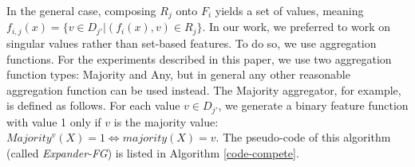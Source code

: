 \documentclass{article}
\theoremstyle{definition}
\begin{document}

In the general case, composing $R_j$ onto $F_i$ yields a set of values, meaning $f_{i,j}(x)=\{v\in D_{j'}|(f_i(x),v)\in R_j\}$. 
In our work, we preferred to work on singular values rather than set-based features. To do so, we use aggregation functions.
For the experiments described in this paper, we use  
two aggregation function types: Majority and Any, but in general any other reasonable aggregation function can be used instead.
The Majority aggregator, for example, is defined as follows.  For each value $v\in D_{j'}$, we generate a binary feature function with value 1 only if $v$ is the majority value: 
$Majority^v(X)=1 \iff majority(X)=v$.
The pseudo-code of this algorithm (called   
\emph{Expander-FG}) is listed in Algorithm \ref{code-compete}.

\end{document}
